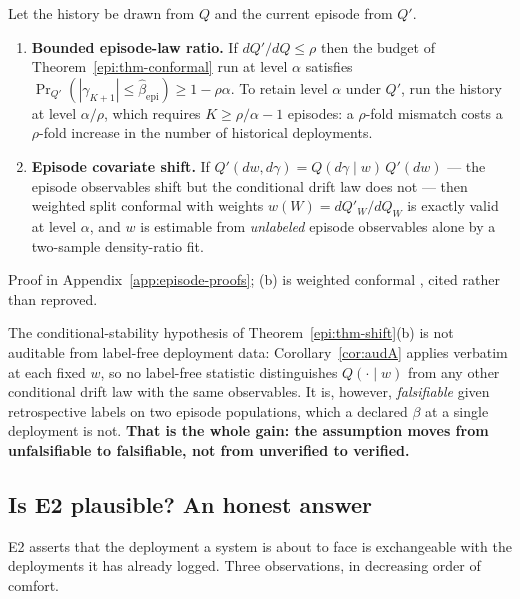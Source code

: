 \begin{theorem}\label{epi:thm-shift}
Let the history be drawn from $Q$ and the current episode from $Q'$.
\begin{enumerate}
\item[\textnormal{(a)}] \textbf{Bounded episode-law ratio.} If $dQ'/dQ\le\rho$ then the budget of
Theorem~\ref{epi:thm-conformal} run at level $\alpha$ satisfies
$\Pr_{Q'}(|\gamma_{K+1}|\le\widehat\beta_{\mathrm{epi}})\ge1-\rho\alpha$. To retain level $\alpha$
under $Q'$, run the history at level $\alpha/\rho$, which requires $K\ge\rho/\alpha-1$ episodes: a
$\rho$-fold mismatch costs a $\rho$-fold increase in the number of historical deployments.
\item[\textnormal{(b)}] \textbf{Episode covariate shift.} If $Q'(dw,d\gamma)=Q(d\gamma\mid w)\,Q'(dw)$
--- the episode observables shift but the conditional drift law does not --- then weighted split
conformal with weights $w(W)=dQ'_W/dQ_W$ is exactly valid at level $\alpha$, and $w$ is estimable
from \emph{unlabeled} episode observables alone by a two-sample density-ratio fit.
\end{enumerate}
Proof in Appendix~\ref{app:episode-proofs}; (b) is weighted conformal
\cite{tibshirani2019conformal}, cited rather than reproved.
\end{theorem}

\begin{corollary}\label{epi:cor-not-free}
The conditional-stability hypothesis of Theorem~\ref{epi:thm-shift}(b) is not auditable from
label-free deployment data: Corollary~\ref{cor:audA} applies verbatim at each fixed $w$, so no
label-free statistic distinguishes $Q(\cdot\mid w)$ from any other conditional drift law with the
same observables. It is, however, \emph{falsifiable} given retrospective labels on two episode
populations, which a declared $\beta$ at a single deployment is not. \textbf{That is the whole gain:
the assumption moves from unfalsifiable to falsifiable, not from unverified to verified.}
\end{corollary}

\subsection{Is E2 plausible? An honest answer}
\label{epi:sec-honesty}

E2 asserts that the deployment a system is about to face is exchangeable with the deployments it has
already logged. Three observations, in decreasing order of comfort.

